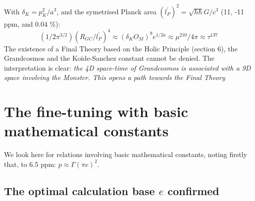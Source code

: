 \documentclass[twoside,draft]{article}
\begin{document}
\begin{sloppypar}
With $\delta_K = p_K^2/a^3 $, and the symetrised Planck area $(l_P^{\prime})^2 = \sqrt{h \hbar} G/c^3$ (11, -11 ppm, and 0.04 \%):
\begin{equation}
(1/2\pi^{3/2})(R_{GC}/l_P^{\prime})^4 \approx (\delta_K O_M )^9 e^{1/2a} \approx  \mu^{210}/4\pi \approx \tau^{137}
\end{equation}
The existence of a Final Theory based on the Holic Principle (section 6), the Grandcosmos and the Koide-Sanchez constant cannot be denied. The interpretation is clear: \textit{the 4D space-time of Grandcosmos is associated with a 9D space involving the Monster. This opens a path towards the Final Theory}

\section{The fine-tuning with basic mathematical constants}

We look here for relations involving basic mathematical constants, noting firstly that, to 6.5 ppm:
$p \approx \Gamma (\pi e)^2$. 

\subsection {The optimal calculation base $e$ confirmed}


\end{sloppypar}
\end{document}
